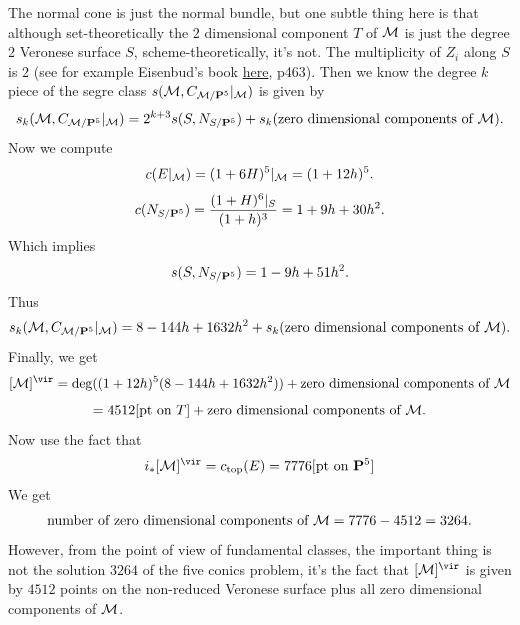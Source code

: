\documentclass[../main.tex]{subfiles}
\begin{document}
The normal cone is just the normal bundle, but one subtle thing here is that although set-theoretically the $2$ dimensional component $T$ of $\M$ is just the degree $2$ Veronese surface $S$, scheme-theoretically, it's not. The multiplicity of $Z_{i}$ along $S$ is $2$ (see for example Eisenbud's book \href{https://scholar.harvard.edu/files/joeharris/files/000-final-3264.pdf}{here}, p463). Then we know the degree $k$ piece of the segre class $s(\M, C_{\M/\P^{5}}|_{\M})$ is given by 
$$s_{k}(\M, C_{\M/\P^{5}}|_{\M})=2^{k+3}s(S, N_{S/\P^{5}})+s_{k}(\text{zero dimensional components of $\M$}).$$
Now we compute 
$$c(E|_{\M})=(1+6H)^{5}|_{\M}=(1+12h)^{5}.$$
$$c(N_{S/\P^{5}})=\frac{(1+H)^{6}|_{S}}{(1+h)^{3}}=1+9h+30h^{2}.$$
Which implies
$$s(S, N_{S/\P^{5}})=1-9h+51h^{2}.$$
Thus
$$s_{k}(\M, C_{\M/\P^{5}}|_{\M})=8-144h+1632h^{2}+s_{k}(\text{zero dimensional components of $\M$}).$$
Finally, we get 
$$[\M]^{\vir}=\deg((1+12h)^{5}(8-144h+1632h^{2}))+\text{zero dimensional components of $\M$}$$
$$=4512[\text{pt on $T$}]+\text{zero dimensional components of $\M$}.$$
Now use the fact that $$i_{*}[\M]^{\vir}=c_{\mathrm{top}}(E)=7776[\text{pt on $\P^{5}$}]$$
We get 
$$\text{number of zero dimensional components of $\M$}=7776-4512=3264.$$
However, from the point of view of fundamental classes, the important thing is not the solution $3264$ of the five conics problem, it's the fact that $[\M]^{\vir}$ is given by $4512$ points on the non-reduced Veronese surface plus all zero dimensional components of $\M$.
\end{document}
